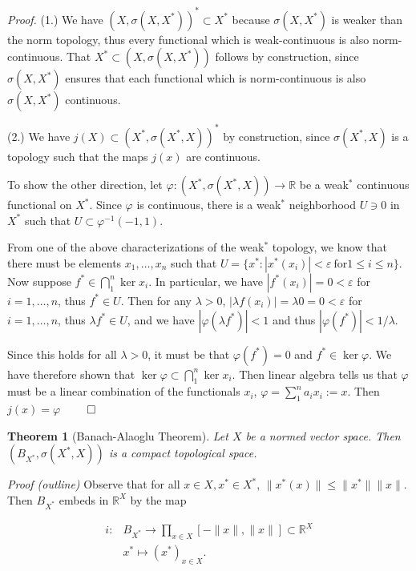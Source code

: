 \documentclass[12pt, reqno]{article}
\theoremstyle{plain}
\newtheorem*{theorem}{Theorem}
\theoremstyle{definition}
\theoremstyle{remark}
\renewcommand{\phi}{\varphi}
\renewcommand{\epsilon}{\varepsilon}
\newcommand{\RR}{\mathbb{R}}
\begin{document}
\textit{Proof.} (1.) We have $(X, \sigma(X, X^*))^* \subset X^*$ because $\sigma(X, X^*)$ is weaker than the norm 
topology, thus every functional which is weak-continuous is also norm-continuous. That $X^* \subset (X, \sigma(X, X^*))$
follows by construction, since $\sigma(X, X^*)$ ensures that each functional which is norm-continuous is also
$\sigma(X, X^*)$ continuous.

(2.) We have $j(X) \subset (X^*, \sigma(X^*, X))^*$ by construction, since $\sigma(X^*, X)$ is a topology 
such that the maps $j(x)$ are continuous. 

To show the other direction, let $\phi: (X^*, \sigma(X^*, X)) \rightarrow \RR$ be a weak$^*$ continuous functional
on $X^*$. Since $\phi$ is continuous, there is a weak$^*$ neighborhood $U \ni 0$ in $X^*$ such that 
$U \subset \phi^{-1}(-1, 1)$.

From one of the above characterizations of the weak$^*$ topology, we know that there must be elements $x_1, \dots, x_n$ 
such that $U = \{x^*: |x^*(x_i)| < \epsilon\ \textrm{for} 1 \leq i \leq n\}$. Now suppose $f^* \in \bigcap_1^n \ker x_i$.
In particular, we have $|f^*(x_i)| = 0 < \epsilon$ for $i = 1, \dots, n$, thus $f^* \in U$. Then for any $\lambda > 0$, 
$|\lambda f(x_i)| = \lambda 0 = 0 < \epsilon$ for $i = 1, \dots, n$, thus $\lambda f^* \in U$, and we have
$|\phi(\lambda f^*)| < 1$ and thus $|\phi(f^*)| < 1/\lambda$. 

Since this holds for all $\lambda > 0$, it must be that $\phi(f^*) = 0$ and $f^* \in \ker\phi$. We have therefore shown
that $\ker\phi \subset \bigcap_1^n \ker x_i$. Then linear algebra tells us that $\phi$ must be a linear combination of
the functionals $x_i$, $\phi = \sum_1^n a_i x_i := x$. Then $j(x) = \phi$ \hfill $\qed$

\begin{theorem}[Banach-Alaoglu Theorem]
    Let $X$ be a normed vector space. Then $(B_{X^*}, \sigma(X^*, X))$ is a compact topological space.
\end{theorem}

\textit{Proof (outline)} Observe that for all $x \in X, x^* \in X^*$, $\|x^*(x)\| \leq \|x^*\|\|x\|$. Then $B_{X^*}$ embeds
in $\RR^X$ by the map 

\begin{align*}
    i: & B_{X^*} \rightarrow \prod_{x \in X} [-\|x\|, \|x\|] \subset \RR^X\\
    & x^* \mapsto (x^*)_{x \in X}.
\end{align*}
\end{document}
